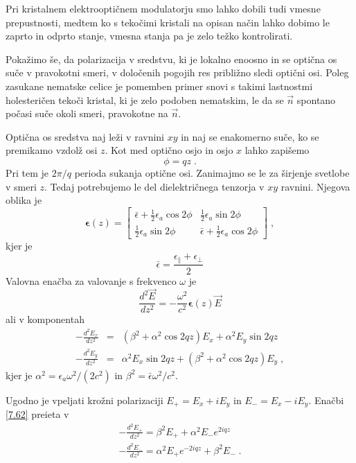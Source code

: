 Pri kristalnem elektrooptičnem modulatorju smo lahko dobili tudi vmesne
prepustnosti, medtem ko s tekočimi kristali na opisan način lahko
dobimo le zaprto in odprto stanje, vmesna stanja pa je zelo težko
kontrolirati.

Pokažimo še, da polarizacija v sredstvu, ki je lokalno enoosno in
se optična os suče v pravokotni smeri, v določenih pogojih res približno
sledi optični osi. Poleg zasukane nematske celice je pomemben primer
snovi s takimi lastnostmi holesteričen tekoči kristal, ki je zelo
podoben nematskim, le da se $\vec{n}$ spontano počasi suče okoli
smeri, pravokotne na $\vec{n}$.

Optična os sredstva naj leži v ravnini $xy$ in naj se enakomerno
suče, ko se premikamo vzdolž osi $z$. Kot med optično osjo in osjo
$x$ lahko zapišemo 
\begin{equation}
\phi=qz\;.\label{7.58}
\end{equation}
 Pri tem je $2\pi/q$ perioda sukanja optične osi. Zanimajmo se le
za širjenje svetlobe v smeri $z$. Tedaj potrebujemo le del dielektričnega
tenzorja v $xy$ ravnini. Njegova oblika je 
\begin{equation}
\boldsymbol{\epsilon}(z)=\left[\begin{array}{cc}
\bar{\epsilon}+\frac{1}{2}\epsilon_{a}\cos2\phi & \frac{1}{2}\epsilon_{a}\sin2\phi\\
\frac{1}{2}\epsilon_{a}\sin2\phi & \bar{\epsilon}+\frac{1}{2}\epsilon_{a}\cos2\phi
\end{array}\right]\;,\label{7.59}
\end{equation}
 kjer je 
\begin{equation}
\bar{\epsilon}=\frac{\epsilon_{\parallel}+\epsilon_{\perp}}{2}\label{7.60}
\end{equation}
 Valovna enačba za valovanje s frekvenco $\omega$ je 
\begin{equation}
\frac{d^{2}\vec{E}}{dz^{2}}=-\frac{\omega^{2}}{c^{2}}\boldsymbol{\epsilon}(z)\vec{E}\label{7.61}
\end{equation}
 ali v komponentah 
\begin{eqnarray}
-\frac{d^{2}E_{x}}{dz^{2}} & = & (\beta^{2}+\alpha^{2}\cos2qz)E_{x}+\alpha^{2}E_{y}\sin2qz\nonumber \\
-\frac{d^{2}E_{y}}{dz^{2}} & = & \alpha^{2}E_{x}\sin2qz+(\beta^{2}+\alpha^{2}\cos2qz)E_{y}\;,
\end{eqnarray}
 kjer je $\alpha^{2}=\epsilon_{a}\omega^{2}/(2c^{2})$ in $\beta^{2}=\bar{\epsilon}\omega^{2}/c^{2}$.

Ugodno je vpeljati krožni polarizaciji $E_{+}=E_{x}+iE_{y}$ in $E_{-}=E_{x}-iE_{y}$.
Enačbi \ref{7.62} preieta v 
\begin{eqnarray}
-\frac{d^{2}E_{+}}{dz^{2}}=\beta^{2}E_{+}+\alpha^{2}E_{-}e^{2iqz}\nonumber \\
-\frac{d^{2}E_{-}}{dz^{2}}=\alpha^{2}E_{+}e^{-2iqz}+\beta^{2}E_{-}\;.
\end{eqnarray}


